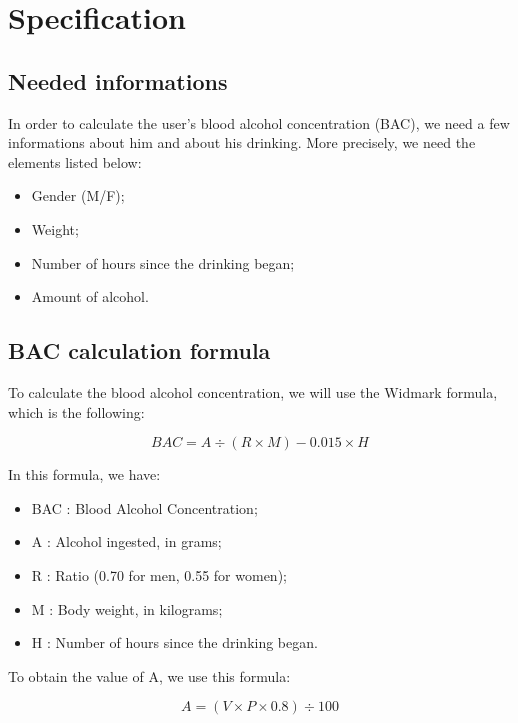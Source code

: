 \section{Specification}
\label{sec:spec}

\subsection{Needed informations}
\label{ssec:info} 

In order to calculate the user's blood alcohol concentration (BAC), we need a few informations about him and about his drinking. More precisely, we need the elements listed below:

\begin{itemize}
\item Gender (M/F);
\item Weight;
\item Number of hours since the drinking began; 
\item Amount of alcohol.
\end{itemize}

\subsection{BAC calculation formula}
\label{ssec:formula}

To calculate the blood alcohol concentration, we will use the Widmark formula, which is the following:

\begin{equation}
   BAC = A \div (R \times M) - 0.015 \times H
\end{equation}
   
In this formula, we have:

\begin{itemize} 
\item BAC : Blood Alcohol Concentration;
\item A : Alcohol ingested, in grams;
\item R : Ratio (0.70 for men, 0.55 for women);
\item M : Body weight, in kilograms;
\item H : Number of hours since the drinking began.
\end{itemize}

To obtain the value of A, we use this formula:

\begin{equation}
   A = (V \times P \times 0.8) \div 100
\end{equation}

